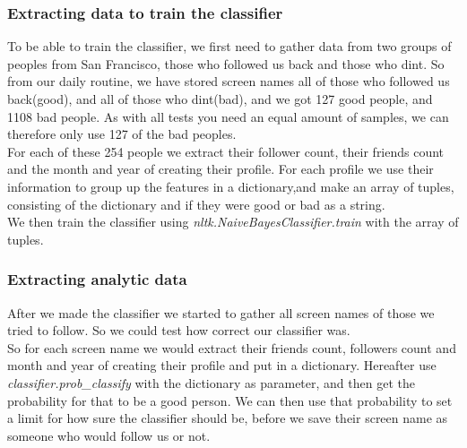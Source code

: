 \subsubsection{Extracting data to train the classifier}
To be able to train the classifier, we first need to gather data from two groups of peoples from San Francisco, those who followed us back and those who dint. So from our daily routine, we have stored screen names all of those who followed us back(good), and all of those who dint(bad), and we got 127 good people, and 1108 bad people. As with all tests you need an equal amount of samples, we can therefore only use 127 of the bad peoples.\\
For each of these 254 people we extract their follower count, their friends count and the month and year of creating their profile. For each profile we use their information to group up the features in a dictionary,and make an array of tuples, consisting of the dictionary and if they were good or bad as a string.\\
We then train the classifier using \textit{nltk.NaiveBayesClassifier.train} with the array of tuples.

\subsubsection{Extracting analytic data}
After we made the classifier we started to gather all screen names of those we tried to follow. So we could test how correct our classifier was.\\
So for each screen name we would extract their friends count, followers count and month and year of creating their profile and put in a dictionary. Hereafter use \textit{classifier.prob\_classify} with the dictionary as parameter, and then get the probability for that to be a good person.
We can then use that probability to set a limit for how sure the classifier should be, before we save their screen name as someone who would follow us or not. 